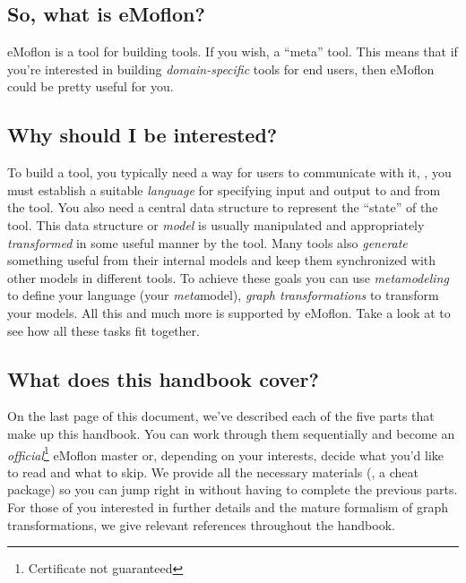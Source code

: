 \subsection*{So, what is eMoflon?}

eMoflon is a tool for building tools.
If you wish, a \enquote{meta} tool. 
This means that if you're interested in building \emph{domain-specific} tools for end users, then eMoflon could be pretty useful for you.


\subsection*{Why should I be interested?}

To build a tool, you typically need a way for users to communicate with it, \idest, you must establish a suitable \emph{language} for specifying input and output to and from the tool.
You also need a central data structure to represent the \enquote{state} of the tool.
This data structure or \emph{model} is usually manipulated and appropriately \emph{transformed} in some useful manner by the tool.
Many tools also \emph{generate} something useful from their internal models and keep them synchronized with other models in different tools.
To achieve these goals you can use \emph{metamodeling} to define your language (your \emph{meta}model), \emph{graph transformations} to transform your models.
All this and much more is supported by eMoflon.
Take a look at  to see how all these tasks fit together.

\subsection*{What does this handbook cover?}

On the last page of this document, we've described each of the five parts that make up this handbook.
You can work through them sequentially and become an \emph{official}\footnote{Certificate not guaranteed} eMoflon master or, depending on your interests, decide what you'd like to read and what to skip.
We provide all the necessary materials (\idest, a cheat package) so you can jump right in without having to complete the previous parts. 
For those of you interested in further details and the mature formalism of graph transformations, we give relevant references throughout the handbook.

